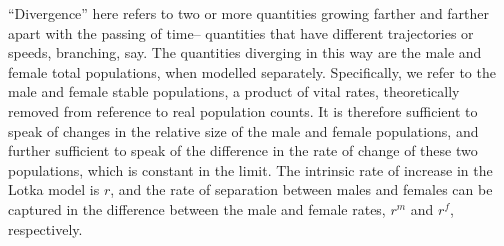 
``Divergence'' here refers to two or more quantities growing farther and
farther apart with the passing of time-- quantities that have different
trajectories or speeds, branching, say. The quantities diverging in this way are
the male and female total populations, when modelled separately. Specifically, we refer to
the male and female stable populations, a product of vital rates,
theoretically removed from reference to real population counts. It is therefore
sufficient to speak of changes in the relative size of the male and female
populations, and further sufficient to speak of the
difference in the rate of change of these two populations, which is constant in
the limit. The intrinsic rate of increase in the Lotka model is $r$, and the
rate of separation between males and females can be captured in the difference
between the male and female rates, $r^m$ and $r^f$, respectively.
